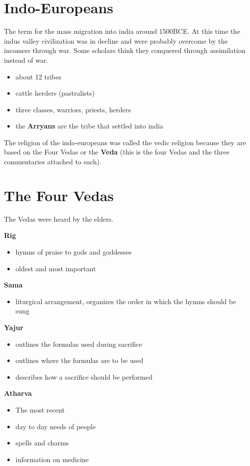 \documentclass{article}
\begin{document}
\section*{Indo-Europeans}
\label{sec:indo_europeans}
The term for the mass migration into india around 1500BCE. At this time the indus valley civilization was in decline and were probably overcome by the incomers through war. Some scholars think they conquered through assimilation instead of war.
\begin{itemize}
	\item about 12 tribes
	\item cattle herders (pastralists)
	\item three classes, warriors, priests, herders
	\item the \textbf{Arryans} are the tribe that settled into india
\end{itemize}

The religion of the indo-europeans was called the vedic religion because they are based on the Four Vedas or the \textbf{Veda} (this is the four Vedas and the three commentaries attached to each).

\section*{The Four Vedas}
\label{sec:the_four_vedas}
The Vedas were heard by the elders.

\textbf{Rig}
\begin{itemize}
	\item hymns of praise to gods and goddesses
	\item oldest and most important
\end{itemize}

\textbf{Sama}
\begin{itemize}
	\item liturgical arrangement, organizes the order in which the hymns should be sung
\end{itemize}

\textbf{Yajur}
\begin{itemize}
	\item outlines the formulas used during sacrifice
	\item outlines where the formulas are to be used
	\item describes how a sacrifice should be performed
\end{itemize}

\textbf{Atharva}
\begin{itemize}
	\item The most recent
	\item day to day needs of people
	\item spells and charms
	\item information on medicine
\end{itemize}
\end{document}
